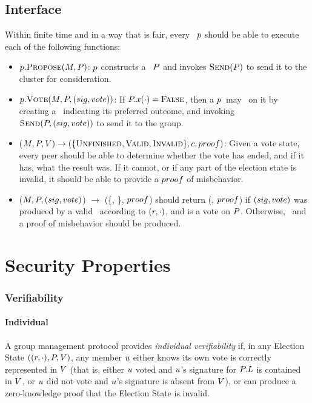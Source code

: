\subsection{Interface}
\label{Subsection:PetitionIface}
Within finite time and in a way that is fair, every \KwPeer~$\peer$ should be
able to execute each of the following functions:
\begin{itemize}
  \item $\SigPropose$: %
    $\peer$ constructs a \StructPetition~$\VarPetition$ and invokes
    $\SigSend[\VarPetition]$ to send it to the cluster for consideration.
  \item $\SigVote$:
    If $\VarPetition.\FunExpir(\cdot) = \AtomFalse$, then a $\peer$~may
    \NameVote~on it by creating a \StructBallot~\Ballot indicating its preferred
    outcome, and invoking $\SigSend[\VarPetition, \Ballot]$ to
    send it to the group.
  \item \NameEvaluate($\VarManifest, \VarPetition, \SetVotes) \to
    (\{\AtomUnfinished, \AtomValid, \AtomInvalid\}, \Choice, \VarZKP)$: Given a
    vote state, every peer should be able to determine whether the vote
    has ended, and if it has, what the result was. If it cannot, or if any part
    of the election state is invalid, it should be able to provide a $\VarZKP$
    of misbehavior.
  \item \NameEvaluate($\VarManifest, \VarPetition, \Ballot$)
    $\to$ (\{\AtomTrue, \AtomFalse\}, $\VarZKP$) should return (\AtomTrue,
    $\VarZKP$) if $\Ballot$ was produced by a valid \KwPeer~according to
    $\State$, and is a vote on $\VarPetition$. Otherwise, \AtomFalse~and a proof
    of misbehavior should be produced.
\end{itemize}

\section{Security Properties}
  \subsubsection{Verifiability}
  \paragraph{Individual}
  A group management protocol provides \emph{individual verifiability} if, in
  any Election State $(\State, \VarPetition, \SetVotes)$, any member
  $\VarMember$ either knows its own vote is correctly represented in $\SetVotes$
  (that is, either $\VarMember$ voted and $\VarMember$'s signature for
  $\VarPetition.\VarLinkScope$  is contained
  in $\SetVotes$, or $\VarMember$ did not vote and $\VarMember$'s signature is
  absent from $\SetVotes$), or can produce a zero-knowledge proof that the
  Election State is invalid.

